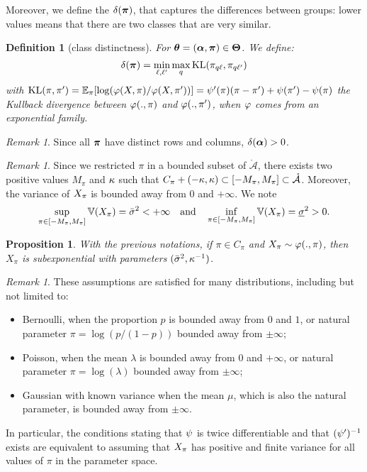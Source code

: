 \documentclass[]{imsart}
\newcommand{\1}{\mathds{1}}
\numberwithin{equation}{section}
\theoremstyle{plain}
\newtheorem{dof}[thm]{Definition}
\newtheorem{proposition}[thm]{Proposition}
\theoremstyle{remark}
\newtheorem{rem}[thm]{Remark}
\begin{document}
Moreover, we define the $ \delta(\boldsymbol{\pi})$, that captures the differences between groups: lower values means that there are two classes that are very similar. 
\begin{dof}[class distinctness]
  \label{def:group-distinctness}
  For $\boldsymbol{\theta} = (\boldsymbol{\alpha}, \boldsymbol{\pi}) \in \boldsymbol{\Theta}$. We define:
  \begin{equation*}
    \delta(\bal) =  \min_{\el, \lp} \max_{q} \KL(\piql, \pi_{q \lp}) 
  \end{equation*}
  with $\operatorname{KL}(\pi,\pi') = \mathbb{E}_{\pi}[\log(\varphi(X, \pi)/\varphi(X, \pi'))]=\psi'(\pi) (\pi - \pi') + \psi(\pi') - \psi(\pi)$ the Kullback divergence between $\varphi(., \pi)$ and $\varphi(., \pi')$, when $\varphi$ comes from an exponential family.
\end{dof}
\begin{rem}
Since all $\boldsymbol{\pi}$ have distinct rows and columns, $\delta(\boldsymbol{\alpha}) > 0$.
\end{rem}

\begin{rem}
Since we restricted $\pi$ in a bounded subset of $\mathring{\mathcal{A}}$, there exists two positive values $M_{\pi}$ and $\kappa$ such that $C_\pi + (-\kappa, \kappa) \subset [-M_{\pi}, M_\pi] \subset \mathring{\mathcal{A}}$. Moreover, the variance of $X_{\pi}$ is bounded away from $0$ and $+\infty$. We note
\begin{equation}
  \label{eq:condition-variance}
  \sup_{\pi \in [-M_{\pi}, M_{\pi}] } \Var(\X_\pi) = \vmax^2 < +\infty \quad \text{and} \quad \inf_{\pi \in [-M_{\pi}, M_{\pi}]} \Var(\X_\pi) = \vmin^2 > 0.
\end{equation}
\end{rem}
\begin{proposition}
With the previous notations, if $\pi \in C_\pi$ and $X_{\pi} \sim \varphi(., \pi)$, then $X_\pi$ is subexponential with parameters $(\bar{\sigma}^2, \kappa^{-1})$.
\end{proposition}

\begin{rem}
These assumptions are satisfied for many distributions, including but not limited to:
\begin{itemize}
\item Bernoulli, when the proportion $p$ is bounded away from $0$ and $1$, or natural parameter $\pi = \log(p / (1 - p))$ bounded away from $\pm \infty$;
\item Poisson, when the mean $\lambda$ is bounded away from $0$ and $+\infty$, or natural parameter $\pi = \log(\lambda)$ bounded away from $\pm \infty$;
\item Gaussian with known variance when the mean $\mu$, which is also the natural parameter, is bounded away from $\pm \infty$.
\end{itemize}
In particular, the conditions stating that $\psi$ is twice differentiable and that $(\psi')^{-1}$ exists are equivalent to assuming that $X_{\pi}$ has positive and finite variance for all values of $\pi$ in the parameter space.
\end{rem}
\end{document}

